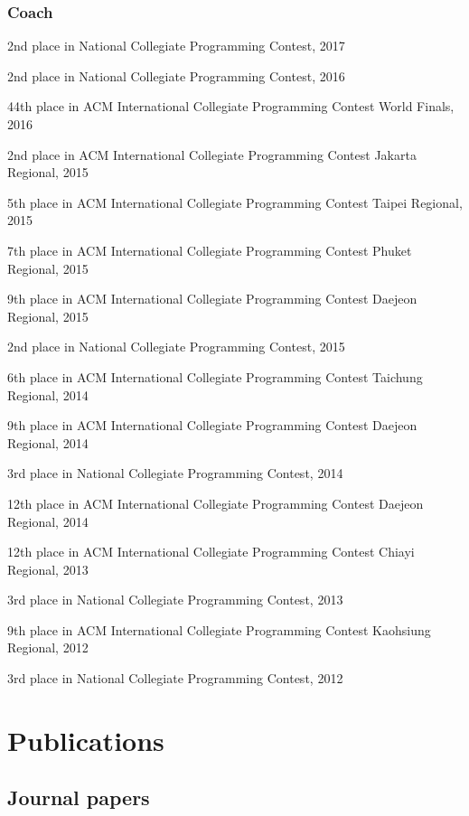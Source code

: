 \documentclass[A4]{article}
\renewenvironment{itemize}{
  \begin{list}{}{
    \setlength{\leftmargin}{1.5em}
  }
}{
  \end{list}
}
\begin{document}
\subsubsection*{Coach}
\begin{itemize}
\item 2nd place in National Collegiate Programming Contest, 2017
\item 2nd place in National Collegiate Programming Contest, 2016
\item 44th place in ACM International Collegiate Programming Contest World Finals, 2016
\item 2nd place in ACM International Collegiate Programming Contest Jakarta Regional, 2015
\item 5th place in ACM International Collegiate Programming Contest Taipei Regional, 2015
\item 7th place in ACM International Collegiate Programming Contest Phuket Regional, 2015
\item 9th place in ACM International Collegiate Programming Contest Daejeon Regional, 2015
\item 2nd place in National Collegiate Programming Contest, 2015
\item 6th place in ACM International Collegiate Programming Contest Taichung Regional, 2014
\item 9th place in ACM International Collegiate Programming Contest Daejeon Regional, 2014
\item 3rd place in National Collegiate Programming Contest, 2014
\item 12th place in ACM International Collegiate Programming Contest Daejeon Regional, 2014
\item 12th place in ACM International Collegiate Programming Contest Chiayi Regional, 2013
\item 3rd place in National Collegiate Programming Contest, 2013
\item 9th place in ACM International Collegiate Programming Contest Kaohsiung Regional, 2012
\item 3rd place in National Collegiate Programming Contest, 2012
\end{itemize}

\section*{Publications}

\subsection*{Journal papers}
\end{document}

